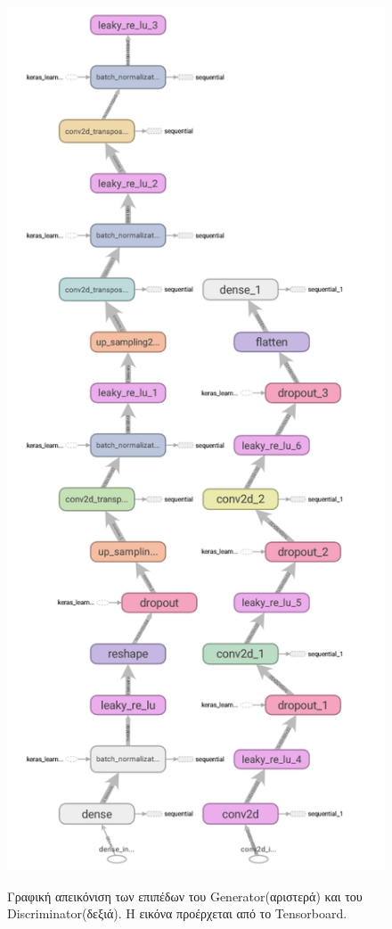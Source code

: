 \begin{figure}[H]
\centering
\includegraphics[width=.8\linewidth]{../images/graphs/tb-model-graph.png}
\label{fig:fig}
\end{figure}

\addtocounter{figure}{-1}
\begin{figure} [H]
\caption{Γραφική απεικόνιση των επιπέδων του Generator(αριστερά) και του Discriminator(δεξιά). Η εικόνα προέρχεται από το Tensorboard.}
\end{figure}


